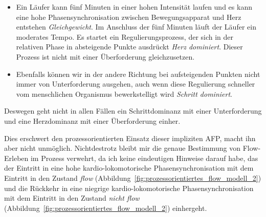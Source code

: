 \begin{itemize}

	\item Ein Läufer kann fünf Minuten in einer hohen Intensität laufen und es kann eine hohe Phasensynchronisation zwischen Bewegungsapparat und Herz entstehen \emph{Gleichgewicht}. Im Anschluss der fünf Minuten läuft der Läufer ein moderates Tempo. Es startet ein Regulierungsprozess, der sich in der relativen Phase in absteigende Punkte ausdrückt \emph{Herz dominiert}. Dieser Prozess ist nicht mit einer Überforderung gleichzusetzen.

	\item Ebenfalls können wir in der andere Richtung bei aufsteigenden Punkten nicht immer von Unterforderung ausgehen, auch wenn diese Regulierung schneller vom menschlichen Organismus bewerkstelligt wird \emph{Schritt dominiert}.

\end{itemize}

Deswegen geht nicht in allen Fällen ein Schrittdominanz mit einer Unterforderung und eine Herzdominanz mit einer Überforderung einher. 

Dies erschwert den prozessorientierten Einsatz dieser impliziten \ac{AFP}, macht ihn aber nicht unmöglich. Nichtdestrotz bleibt mir die genaue Bestimmung von Flow-Erleben im Prozess verwehrt, da ich keine eindeutigen Hinweise darauf habe, das der Eintritt in eine hohe kardio-lokomotorische Phasensynchronisation mit dem Eintritt in den Zustand \emph{flow} (Abbildung~\ref{fig:prozessorientiertes_flow_modell_2}) und die Rückkehr in eine niegrige kardio-lokomotorische Phasensynchronisation mit dem Eintritt in den Zustand \emph{nicht flow} (Abbildung~\ref{fig:prozessorientiertes_flow_modell_2}) einhergeht. 


